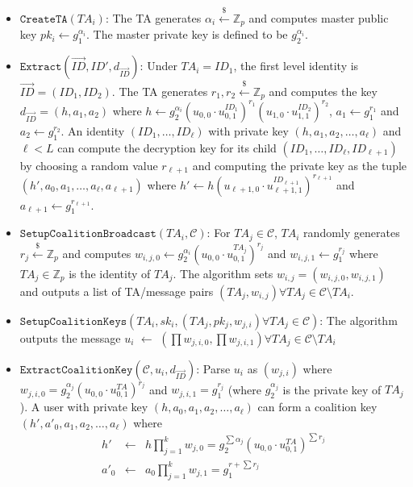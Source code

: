\documentclass[10pt]{llncs}
\newcommand{\C}{\mathcal{C}}
\newcommand{\Zbb}{\mathbb{Z}}
\newcommand{\ID}{\mathit{ID}}
\newcommand{\TA}{\mathit{TA}}
\newcommand{\getsr}{\stackrel{{\scriptscriptstyle\$}}{\gets}}
\begin{document}
\begin{itemize}
\item $\texttt{CreateTA}(\TA_i)$: The TA generates $\alpha_i \getsr \Zbb_{p}$ and computes master public key $pk_i \gets g_{1}^{\alpha_i}$. The master private key is defined to be $g_{2}^{\alpha_i}$.\medskip

\item $\texttt{Extract}(\vec{ID},\ID',d_{\vec{\ID}})$: Under $\TA_i = \ID_1$, the first level identity is $\vec{\ID}=(\ID_1, \ID_2)$. The TA generates $r_1,r_2\getsr \Zbb_{p}$ and computes the key $d_{\vec{\ID}} = (h,a_{1},a_{2})$ where $h\gets g_{2}^{\alpha_i}(u_{0,0} \cdot u_{0,1}^{\ID_1})^{r_1}(u_{1,0} \cdot u_{1,1}^{\ID_2})^{r_{2}}$, $a_{1}\gets g_{1}^{r_{1}}$ and $a_{2} \gets g_{1}^{r_{2}}$. An identity $(\ID_{1},\ldots,\ID_{\ell})$ with private key $(h,a_{1},a_{2},\ldots,a_{\ell})$ and $\ell < L$ can compute the decryption key for its child $(\ID_{1},\ldots,\ID_{\ell},\ID_{\ell+1})$ by choosing a random value $r_{\ell+1}$ and computing the private key as the tuple $(h',a_{0},a_{1},\ldots,a_{\ell},a_{\ell+1})$ where $h' \gets h(u_{\ell+1,0}\cdot u_{\ell+1,1}^{\ID_{\ell+1}})^{r_{\ell+1}}$ and $a_{\ell+1}\gets g_{1}^{r_{\ell+1}}$.\medskip

\item $\texttt{SetupCoalitionBroadcast}(\TA_i, \C)$: For $\TA_j \in \C$, $\TA_i$ randomly generates $r_{j}\getsr \Zbb_{p}$ and computes $w_{i,j,0} \gets g_{2}^{\alpha_i}(u_{0,0} \cdot u_{0,1}^{\TA_{j}})^{r_{j}}$ and $w_{i,j,1} \gets g_{1}^{r_{j}}$ where $\TA_{j} \in \Zbb_{p}$ is the identity of $\TA_{j}$. The algorithm sets $w_{i,j}=(w_{i,j,0},w_{i,j,1})$ and outputs a list of TA/message pairs $(\TA_{j},w_{i,j})\forall \TA_j \in \C \setminus \TA_i$.\medskip

\item $\texttt{SetupCoalitionKeys}(\TA_i,sk_i,(\TA_j, pk_j, w_{j,i}) \forall \TA_j \in \C)$: The algorithm outputs the message $u_i$ $\gets$ $(\prod w_{j,i,0}, \prod w_{j,i,1}) \forall \TA_j \in \C \setminus \TA_i$ \medskip

\item $\texttt{ExtractCoalitionKey}(\C,u_i,d_{\vec{\ID}})$: Parse $u_i$ as $(w_{j,i})$ where $w_{j,i,0} = g_{2}^{\alpha_{j}}(u_{0,0} \cdot u_{0,1}^{\TA})^{r_{j}}$ and $w_{j,i,1} = g_{1}^{r_{j}}$ (where $g_{2}^{\alpha_{j}}$ is the private key of $\TA_{j}$). A user with private key $(h,a_{0},a_{1},a_{2},\ldots,a_{\ell})$ can form a coalition key $(h',a'_{0},a_{1},a_{2},\ldots,a_{\ell})$ where
\begin{eqnarray*}
	h' & \gets & h \prod_{j=1}^{k} w_{j,0} = g_{2}^{\sum \alpha_{j}}(u_{0,0} \cdot u_{0,1}^{\TA})^{\sum r_{j}} \\
	a'_{0} & \gets & a_{0} \prod_{j=1}^{k} w_{j,1} = g_{1}^{r+\sum r_{j}}
\end{eqnarray*}


\end{itemize}
\end{document}
